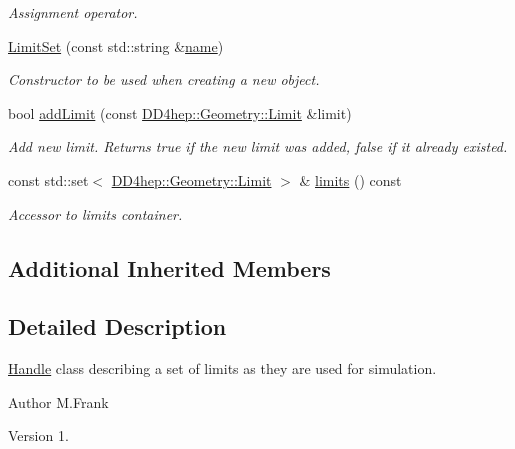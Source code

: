 \begin{DoxyCompactItemize}
\begin{DoxyCompactList}\small\item\em Assignment operator. \end{DoxyCompactList}\item 
\hyperlink{class_d_d4hep_1_1_geometry_1_1_limit_set_a97abd909eb2de79b0542bab693c3c836}{Limit\+Set} (const std\+::string \&\hyperlink{class_d_d4hep_1_1_handle_a27c7d467a609ab32c133e1f3c7d85ef5}{name})
\begin{DoxyCompactList}\small\item\em Constructor to be used when creating a new object. \end{DoxyCompactList}\item 
bool \hyperlink{class_d_d4hep_1_1_geometry_1_1_limit_set_a7cbdab17081174e9a0d1d8ce71246700}{add\+Limit} (const \hyperlink{class_d_d4hep_1_1_geometry_1_1_limit}{D\+D4hep\+::\+Geometry\+::\+Limit} \&limit)
\begin{DoxyCompactList}\small\item\em Add new limit. Returns true if the new limit was added, false if it already existed. \end{DoxyCompactList}\item 
const std\+::set$<$ \hyperlink{class_d_d4hep_1_1_geometry_1_1_limit}{D\+D4hep\+::\+Geometry\+::\+Limit} $>$ \& \hyperlink{class_d_d4hep_1_1_geometry_1_1_limit_set_a2a6b24f2aad16e6ca3c55a46db02268b}{limits} () const
\begin{DoxyCompactList}\small\item\em Accessor to limits container. \end{DoxyCompactList}\end{DoxyCompactItemize}
\subsection*{Additional Inherited Members}


\subsection{Detailed Description}
\hyperlink{class_d_d4hep_1_1_handle}{Handle} class describing a set of limits as they are used for simulation. 

\begin{DoxyAuthor}{Author}
M.\+Frank 
\end{DoxyAuthor}
\begin{DoxyVersion}{Version}
1. 
\end{DoxyVersion}


